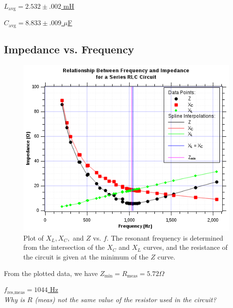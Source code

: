 \documentclass[twocolumn,english]{IEEEtran}
\theoremstyle{plain}
\theoremstyle{plain}
\begin{document}
\underline{$L_{\text{avg}} = 2.532\pm .002$ mH}

\underline{$C_{\text{avg}} = 8.833 \pm .009$ $\mu$F}

\hrulefill

\subsection{Impedance vs. Frequency}


\begin{figure}[H]
	\begin{centering}
	\begin{center}
	\includegraphics[width=\linewidth]{./Images/Part2.png}
	\caption{Plot of $X_L, X_C, $ and $Z$ vs. $f$. The resonant frequency is determined from the intersection of the $X_C$ and $X_L$ curves, and the resistance of the circuit is given at the minimum of the $Z$ curve.}
	\label{fig:xf_graph1}
	\end{center}
	\par\end{centering}
\end{figure}

From the plotted data, we have
\hfill\underline{$Z_{\text{min}} = R_{\text{meas}} = 5.72 \Omega$}

\hfill\underline{$f_{\text{res,meas}} = 1044$ Hz} \\

\textit{Why is $R$ (meas) not the same value of the resistor used in the circuit?}
\end{document}
